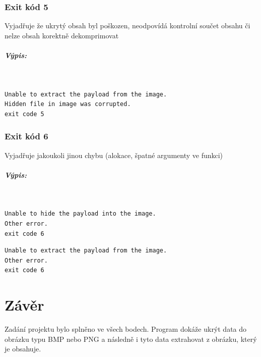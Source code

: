 \documentclass[12pt]{report}
\begin{document}
    \subsection{Exit kód 5}
    Vyjadřuje že ukrytý obsah byl poškozen, neodpovídá kontrolní součet obsahu
    či nelze obsah korektně dekomprimovat\\

    \paragraph{Výpis:}\\

    \begin{mdframed}
        \begin{verbatim}
Unable to extract the payload from the image.
Hidden file in image was corrupted.
exit code 5
        \end{verbatim}
    \end{mdframed}

    \subsection{Exit kód 6}
    Vyjadřuje jakoukoli jinou chybu (alokace, špatné argumenty ve funkci)\\

    \paragraph{Výpis:}\\

    \begin{mdframed}
        \begin{verbatim}
Unable to hide the payload into the image.
Other error.
exit code 6
        \end{verbatim}
    \end{mdframed}

        \begin{mdframed}
            \begin{verbatim}
Unable to extract the payload from the image.
Other error.
exit code 6
            \end{verbatim}
        \end{mdframed}



    \chapter{Závěr}
    Zadání projektu bylo splněno ve všech bodech. Program dokáže ukrýt data do obrázku typu BMP nebo PNG a následně i tyto data extrahovat z obrázku, který je obsahuje.
\end{document}

